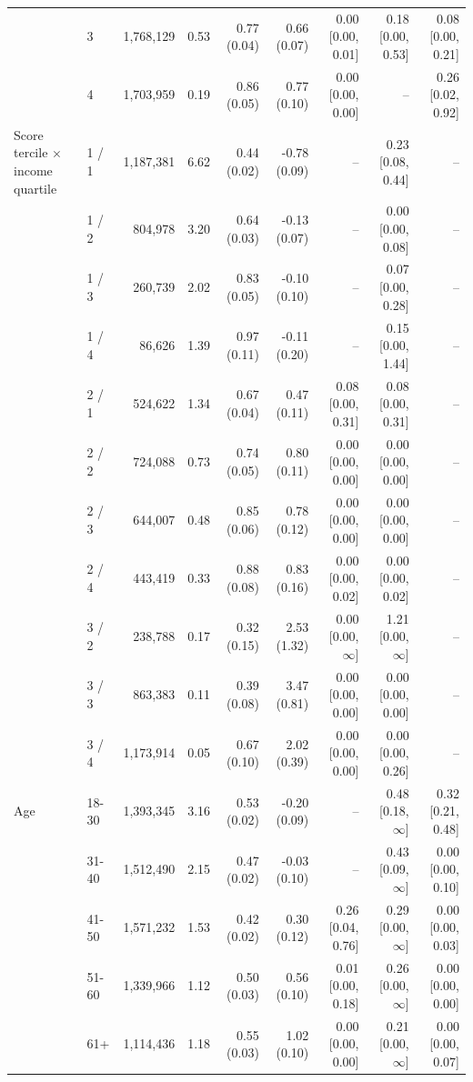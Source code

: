 \begin{tabular}{llrrrrrrr}
 & 3 & 1,768,129 & 0.53 & 0.77 (0.04) & 0.66 (0.07) & 0.00 [0.00, 0.01] & 0.18 [0.00, 0.53] & 0.08 [0.00, 0.21] \\
 & 4 & 1,703,959 & 0.19 & 0.86 (0.05) & 0.77 (0.10) & 0.00 [0.00, 0.00] & -- & 0.26 [0.02, 0.92] \\
\addlinespace
Score tercile $\times$ income quartile & 1 / 1 & 1,187,381 & 6.62 & 0.44 (0.02) & -0.78 (0.09) & -- & 0.23 [0.08, 0.44] & -- \\
 & 1 / 2 & 804,978 & 3.20 & 0.64 (0.03) & -0.13 (0.07) & -- & 0.00 [0.00, 0.08] & -- \\
 & 1 / 3 & 260,739 & 2.02 & 0.83 (0.05) & -0.10 (0.10) & -- & 0.07 [0.00, 0.28] & -- \\
 & 1 / 4 & 86,626 & 1.39 & 0.97 (0.11) & -0.11 (0.20) & -- & 0.15 [0.00, 1.44] & -- \\
 & 2 / 1 & 524,622 & 1.34 & 0.67 (0.04) & 0.47 (0.11) & 0.08 [0.00, 0.31] & 0.08 [0.00, 0.31] & -- \\
 & 2 / 2 & 724,088 & 0.73 & 0.74 (0.05) & 0.80 (0.11) & 0.00 [0.00, 0.00] & 0.00 [0.00, 0.00] & -- \\
 & 2 / 3 & 644,007 & 0.48 & 0.85 (0.06) & 0.78 (0.12) & 0.00 [0.00, 0.00] & 0.00 [0.00, 0.00] & -- \\
 & 2 / 4 & 443,419 & 0.33 & 0.88 (0.08) & 0.83 (0.16) & 0.00 [0.00, 0.02] & 0.00 [0.00, 0.02] & -- \\
 & 3 / 2 & 238,788 & 0.17 & 0.32 (0.15) & 2.53 (1.32) & 0.00 [0.00, $\infty$] & 1.21 [0.00, $\infty$] & -- \\
 & 3 / 3 & 863,383 & 0.11 & 0.39 (0.08) & 3.47 (0.81) & 0.00 [0.00, 0.00] & 0.00 [0.00, 0.00] & -- \\
 & 3 / 4 & 1,173,914 & 0.05 & 0.67 (0.10) & 2.02 (0.39) & 0.00 [0.00, 0.00] & 0.00 [0.00, 0.26] & -- \\
\addlinespace
Age & 18-30 & 1,393,345 & 3.16 & 0.53 (0.02) & -0.20 (0.09) & -- & 0.48 [0.18, $\infty$] & 0.32 [0.21, 0.48] \\
 & 31-40 & 1,512,490 & 2.15 & 0.47 (0.02) & -0.03 (0.10) & -- & 0.43 [0.09, $\infty$] & 0.00 [0.00, 0.10] \\
 & 41-50 & 1,571,232 & 1.53 & 0.42 (0.02) & 0.30 (0.12) & 0.26 [0.04, 0.76] & 0.29 [0.00, $\infty$] & 0.00 [0.00, 0.03] \\
 & 51-60 & 1,339,966 & 1.12 & 0.50 (0.03) & 0.56 (0.10) & 0.01 [0.00, 0.18] & 0.26 [0.00, $\infty$] & 0.00 [0.00, 0.00] \\
 & 61+ & 1,114,436 & 1.18 & 0.55 (0.03) & 1.02 (0.10) & 0.00 [0.00, 0.00] & 0.21 [0.00, $\infty$] & 0.00 [0.00, 0.07] \\

\end{tabular}
